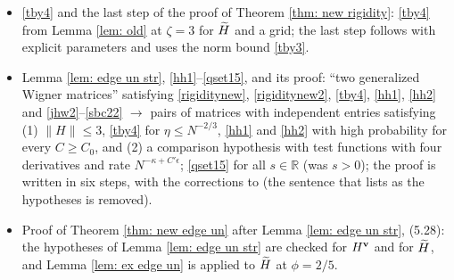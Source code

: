\begin{itemize}
\item \eqref{tby4} and the last step of the proof of Theorem \ref{thm: new rigidity}: \eqref{tby4} from Lemma \ref{lem: old} at $\zeta=3$ for $\widetilde H$ and a grid; the last step follows \cite[(5.4)--(5.15)]{EYY} with explicit parameters and uses the norm bound \eqref{tby3}.
\item Lemma \ref{lem: edge un str}, \eqref{hh1}--\eqref{qset15}, and its proof: ``two generalized Wigner matrices'' satisfying \eqref{rigiditynew}, \eqref{rigiditynew2}, \eqref{tby4}, \eqref{hh1}, \eqref{hh2} and \eqref{jhw2}--\eqref{sbc22} $\to$ pairs of matrices with independent entries satisfying (1) $\|H\|\le3$, \eqref{tby4} for $\eta\le N^{-2/3}$, \eqref{hh1} and \eqref{hh2} with high probability for every $C\ge C_0$, and (2) a comparison hypothesis with test functions with four derivatives and rate $N^{-\kappa+C'\epsilon}$; \eqref{qset15} for all $s\in\mathbb R$ (was $s>0$); the proof is written in six steps, with the corrections to \cite{EYY} (the sentence that lists \cite[(2.19), (2.25), (2.26), (6.2), (6.3)]{EYY} as the hypotheses is removed).
\item Proof of Theorem \ref{thm: new edge un} after Lemma \ref{lem: edge un str}, (5.28): the hypotheses of Lemma \ref{lem: edge un str} are checked for $H^{\mathbf{v}}$ and for $\widetilde H$, and Lemma \ref{lem: ex edge un} is applied to $\widetilde H$ at $\phi=2/5$.
\end{itemize}


